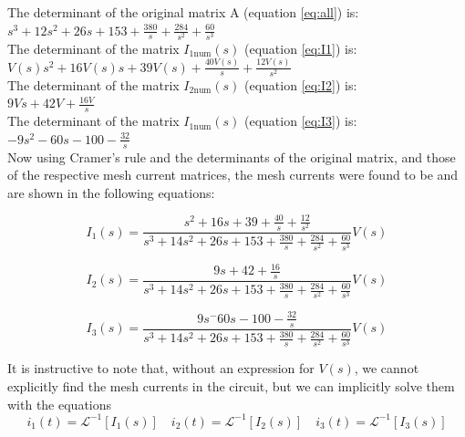 \documentclass[12pt, a4paper]{article}
\begin{document}
	\noindent The determinant of the original matrix A (equation \ref{eq:all}) is:\\
	\texttt{$s^3+12s^2+26s+153+\frac{380}{s}+\frac{284}{s^2}+\frac{60}{s^3}$}\\
	The determinant of the matrix $I_{1 \text{num}}(s)$ (equation \ref{eq:I1}) is:\\
	\texttt{$V(s)s^2+16V(s)s+39V(s)+\frac{40V(s)}{s}+\frac{12V(s)}{s^2}$}\\
	The determinant of the matrix $I_{2 \text{num}}(s)$ (equation \ref{eq:I2}) is:\\
	\texttt{$9Vs+42V+\frac{16V}{s}$}\\
	The determinant of the matrix $I_{1 \text{num}}(s)$ (equation \ref{eq:I3}) is:\\
	\texttt{$-9s^2-60s-100-\frac{32}{s}$}\\


	\noindent Now using Cramer's rule and the determinants of the original matrix, and those of the respective mesh current matrices, the mesh currents were found to be and are shown in the following equations:

	\begin{equation}
		\label{eq:I1_final}
		I_1(s) = \frac{s^2 + 16s + 39 + \frac{40}{s} + \frac{12}{s^2}}{s^3 + 14s^2 + 26s + 153 + \frac{380}{s} + \frac{284}{s^2} + \frac{60}{s^3}}V(s)
	\end{equation}

	\begin{equation}
		\label{eq:I2_final}
		I_2(s) = \frac{9s + 42 + \frac{16}{s}}{s^3 + 14s^2 + 26s + 153 + \frac{380}{s} + \frac{284}{s^2} + \frac{60}{s^3}}V(s)
	\end{equation}

	\begin{equation}
		\label{eq:I3_final}
		I_3(s) = \frac{9s^ - 60s - 100 - \frac{32}{s}}{s^3 + 14s^2 + 26s + 153 + \frac{380}{s} + \frac{284}{s^2} + \frac{60}{s^3}}V(s)
	\end{equation}


	\noindent It is instructive to note that, without an expression for $V(s)$, we cannot explicitly find the mesh currents in the circuit, but we can implicitly solve them with the equations
	\[
		i_1(t) = \mathcal{L}^{-1}[I_1(s)] \quad i_2(t) = \mathcal{L}^{-1}[I_2(s)] \quad i_3(t) = \mathcal{L}^{-1}[I_3(s)]
	\]
\end{document}
